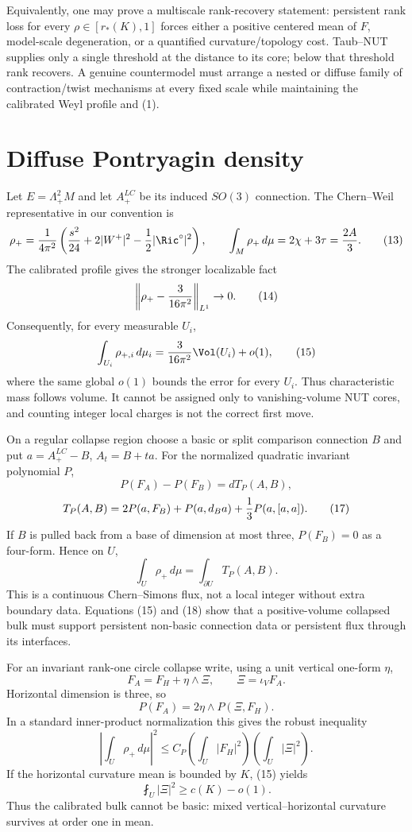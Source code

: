 \medskip
Equivalently, one may prove a multiscale rank-recovery statement: persistent
rank loss for every $\rho\in[r_*(K),1]$ forces either a positive centered
mean of $F$, model-scale degeneration, or a quantified curvature/topology
cost.  Taub--NUT supplies only a single threshold at the distance to its core;
below that threshold rank recovers.  A genuine countermodel must arrange a
nested or diffuse family of contraction/twist mechanisms at every fixed
scale while maintaining the calibrated Weyl profile and (1).

\section{Diffuse Pontryagin density}

Let $E=\Lambda^2_+M$ and let $A_+^{LC}$ be its induced $SO(3)$ connection.
The Chern--Weil representative in our convention is
\[
 \rho_+={1\over4\pi^2}\left(
 {s^2\over24}+2|W^+|^2-{1\over2}|\Ric^\circ|^2
 \right),
 \qquad \int_M\rho_+\,d\mu=2\chi+3\tau={2A\over3}.             \tag{13}
\]
The calibrated profile gives the stronger localizable fact
\[
 \left\|\rho_+-{3\over16\pi^2}\right\|_{L^1}\to0.             \tag{14}
\]
Consequently, for every measurable $U_i$,
\[
 \int_{U_i}\rho_{+,i}\,d\mu_i
 ={3\over16\pi^2}\Vol(U_i)+o(1),                               \tag{15}
\]
where the same global $o(1)$ bounds the error for every $U_i$.  Thus
characteristic mass follows volume.  It cannot be assigned only to
vanishing-volume NUT cores, and counting integer local charges is not the
correct first move.

On a regular collapse region choose a basic or split comparison connection
$B$ and put $a=A_+^{LC}-B$, $A_t=B+ta$.  For the normalized quadratic
invariant polynomial $P$,
\[
 P(F_A)-P(F_B)=dT_P(A,B),                                      \tag{16}
\]
\[
 T_P(A,B)=2P(a,F_B)+P(a,d_Ba)+{1\over3}P(a,[a,a]).              \tag{17}
\]
If $B$ is pulled back from a base of dimension at most three,
$P(F_B)=0$ as a four-form.  Hence on $U$,
\[
 \int_U\rho_+\,d\mu=\int_{\partial U}T_P(A,B).                \tag{18}
\]
This is a continuous Chern--Simons flux, not a local integer without extra
boundary data.  Equations (15) and (18) show that a positive-volume collapsed
bulk must support persistent non-basic connection data or persistent flux
through its interfaces.

For an invariant rank-one circle collapse write, using a unit vertical
one-form $\eta$,
\[
 F_A=F_H+\eta\wedge\Xi,
 \qquad \Xi=\iota_VF_A.                                       \tag{19}
\]
Horizontal dimension is three, so
\[
 P(F_A)=2\eta\wedge P(\Xi,F_H).                                \tag{20}
\]
In a standard inner-product normalization this gives the robust inequality
\[
 \left|\int_U\rho_+\,d\mu\right|^2
 \le C_P\left(\int_U|F_H|^2\right)
          \left(\int_U|\Xi|^2\right).                          \tag{21}
\]
If the horizontal curvature mean is bounded by $K$, (15) yields
\[
 \fint_U|\Xi|^2\ge c(K)-o(1).                                 \tag{22}
\]
Thus the calibrated bulk cannot be basic: mixed vertical--horizontal
curvature survives at order one in mean.

